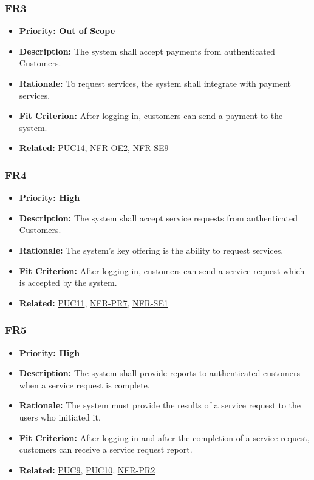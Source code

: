 \documentclass[12pt]{article}
\begin{document}
\subsubsection*{FR3}
\label{sec:FR3}
\begin{itemize}
  \item \textbf{Priority: Out of Scope}
  \item \textbf{Description:} The system shall accept payments from authenticated Customers.
  \item \textbf{Rationale:} To request services, the system shall integrate with payment services.
  \item \textbf{Fit Criterion:} After logging in, customers can send a payment to the system.
  \item \textbf{Related:} \hyperref[sec:PUC14]{PUC14}, \hyperref[sec:OE2]{NFR-OE2}, \hyperref[sec:SE9]{NFR-SE9}
\end{itemize}
\subsubsection*{FR4}
\label{sec:FR4}
\begin{itemize}
  \item \textbf{Priority: High}
  \item \textbf{Description:} The system shall accept service requests from authenticated Customers.
  \item \textbf{Rationale:} The system’s key offering is the ability to request services.
  \item \textbf{Fit Criterion:} After logging in, customers can send a service request which is accepted by the system.
  \item \textbf{Related:} \hyperref[sec:PUC11]{PUC11}, \hyperref[sec:PR7]{NFR-PR7}, \hyperref[sec:SE1]{NFR-SE1}
\end{itemize}
\subsubsection*{FR5}
\label{sec:FR5}
\begin{itemize}
  \item \textbf{Priority: High}
  \item \textbf{Description:} The system shall provide reports to authenticated customers when a service request is complete.
  \item \textbf{Rationale:} The system must provide the results of a service request to the users who initiated it.
  \item \textbf{Fit Criterion:} After logging in and after the completion of a service request, customers can receive a service request report.
  \item \textbf{Related:} \hyperref[sec:PUC9]{PUC9}, \hyperref[sec:PUC10]{PUC10}, \hyperref[sec:PR2]{NFR-PR2}
\end{itemize}
\end{document}
